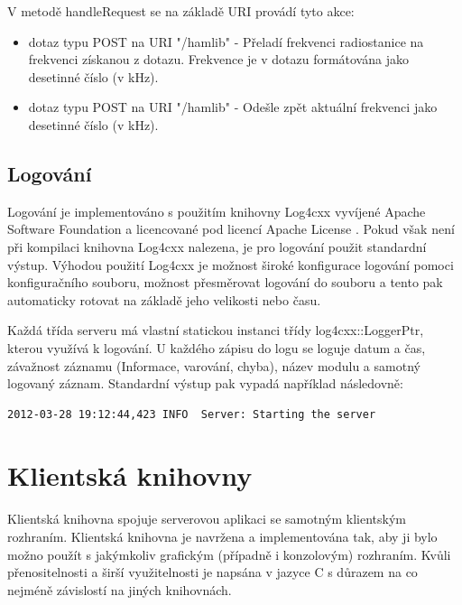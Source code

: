 V metodě handleRequest se na základě URI provádí tyto akce:

\begin{itemize}
\item dotaz typu POST na URI "/hamlib" - Přeladí frekvenci radiostanice %
na frekvenci získanou z dotazu. Frekvence
je v dotazu formátována jako desetinné číslo (v kHz).
\item dotaz typu POST na URI "/hamlib" - Odešle zpět aktuální frekvenci jako
desetinné číslo (v kHz).
\end{itemize}



\subsection{Logování}
\label{implementace_logovani}

Logování je implementováno s použitím knihovny Log4cxx vyvíjené Apache Software Foundation a licencované pod licencí
Apache License \cite{log4cxx}.  %
Pokud však není při kompilaci knihovna Log4cxx nalezena, je pro logování použit standardní výstup.
Výhodou použití Log4cxx je možnost široké konfigurace logování pomoci konfiguračního souboru, možnost přesměrovat
logování do souboru a tento pak automaticky rotovat na základě jeho velikosti nebo času.

Každá třída serveru má vlastní statickou instanci třídy log4cxx::LoggerPtr, kterou využívá k logování.
U každého zápisu do logu se loguje datum a čas, závažnost záznamu (Informace, varování, chyba), název modulu a samotný
logovaný záznam. Standardní výstup pak vypadá například následovně:

\begin{verbatim}
2012-03-28 19:12:44,423 INFO  Server: Starting the server
\end{verbatim}

\section{Klientská knihovny}
\label{implementace_knihovna}

Klientská knihovna spojuje serverovou aplikaci se samotným klientským rozhraním.
Klientská knihovna je navržena a implementována
tak, aby ji bylo možno použít s jakýmkoliv grafickým (případně i konzolovým) rozhraním. Kvůli přenositelnosti a
širší využitelnosti je napsána v jazyce C s důrazem na co nejméně závislostí na jiných knihovnách.

